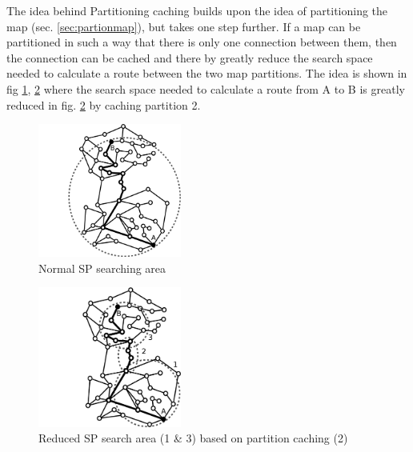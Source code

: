 The idea behind Partitioning caching builds upon the idea of partitioning the map (sec. \ref{sec:partionmap}), but takes one step further. If a map can be partitioned in such a way that there is only one connection between them, then the connection can be cached and there by greatly reduce the search space needed to calculate a route between the two map partitions. The idea is shown in fig \ref{fig:cacheB}, \ref{fig:cacheA} where the search space needed to calculate a route from A to B is greatly reduced in fig. \ref{fig:cacheA} by caching partition 2.

\begin{figure}
  \center
	\includegraphics[width=0.42\textwidth]{figures/partSPcacheB.pdf}
	\caption{Normal SP searching area}
  \label{fig:cacheB}
\end{figure}

\begin{figure}
  \center
	\includegraphics[width=0.42\textwidth]{figures/partSPcacheA.pdf}
	\caption{Reduced SP search area (1 \& 3) based on partition caching (2)}
  \label{fig:cacheA}
\end{figure}


